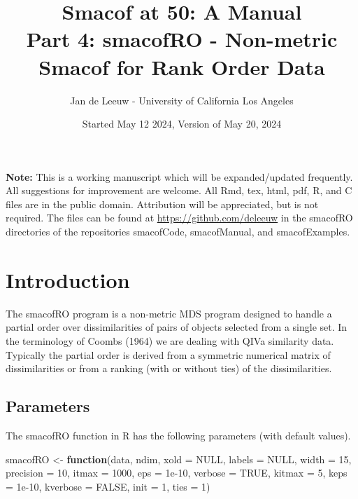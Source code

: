 \documentclass[
  12pt,
]{article}
\title{Smacof at 50: A Manual\\
Part 4: smacofRO - Non-metric Smacof for Rank Order Data}
\author{Jan de Leeuw - University of California Los Angeles}
\date{Started May 12 2024, Version of May 20, 2024}
\newenvironment{Shaded}{\begin{snugshade}}{\end{snugshade}}
\newcommand{\AttributeTok}[1]{\textcolor[rgb]{0.13,0.29,0.53}{#1}}
\newcommand{\ConstantTok}[1]{\textcolor[rgb]{0.56,0.35,0.01}{#1}}
\newcommand{\ControlFlowTok}[1]{\textcolor[rgb]{0.13,0.29,0.53}{\textbf{#1}}}
\newcommand{\DecValTok}[1]{\textcolor[rgb]{0.00,0.00,0.81}{#1}}
\newcommand{\FloatTok}[1]{\textcolor[rgb]{0.00,0.00,0.81}{#1}}
\newcommand{\NormalTok}[1]{#1}
\newcommand{\OtherTok}[1]{\textcolor[rgb]{0.56,0.35,0.01}{#1}}
\begin{document}
\maketitle

{
\setcounter{tocdepth}{3}
\tableofcontents
}
\textbf{Note:} This is a working manuscript which will be expanded/updated
frequently. All suggestions for improvement are welcome. All Rmd, tex,
html, pdf, R, and C files are in the public domain. Attribution will be
appreciated, but is not required. The files can be found at
\url{https://github.com/deleeuw} in the smacofRO directories of the
repositories smacofCode, smacofManual, and smacofExamples.

\section{Introduction}\label{introduction}

The smacofRO program is a non-metric MDS program designed
to handle a partial order over dissimilarities of pairs of objects selected
from a single set. In the terminology of Coombs (1964) we are dealing
with QIVa similarity data. Typically the partial order is derived from a
symmetric numerical matrix of dissimilarities or from a ranking
(with or without ties) of the dissimilarities.

\subsection{Parameters}\label{parameters}

The smacofRO function in R has the following parameters (with default values).

\begin{Shaded}
\begin{Highlighting}[]
\NormalTok{smacofRO }\OtherTok{\textless{}{-}} \ControlFlowTok{function}\NormalTok{(data,}
\NormalTok{                     ndim,}
                     \AttributeTok{xold =} \ConstantTok{NULL}\NormalTok{,}
                     \AttributeTok{labels =} \ConstantTok{NULL}\NormalTok{,}
                     \AttributeTok{width =} \DecValTok{15}\NormalTok{,}
                     \AttributeTok{precision =} \DecValTok{10}\NormalTok{,}
                     \AttributeTok{itmax =} \DecValTok{1000}\NormalTok{,}
                     \AttributeTok{eps =} \FloatTok{1e{-}10}\NormalTok{,}
                     \AttributeTok{verbose =} \ConstantTok{TRUE}\NormalTok{,}
                     \AttributeTok{kitmax =} \DecValTok{5}\NormalTok{,}
                     \AttributeTok{keps =} \FloatTok{1e{-}10}\NormalTok{,}
                     \AttributeTok{kverbose =} \ConstantTok{FALSE}\NormalTok{,}
                     \AttributeTok{init =} \DecValTok{1}\NormalTok{,}
                     \AttributeTok{ties =} \DecValTok{1}\NormalTok{)}
\end{Highlighting}
\end{Shaded}
\end{document}
